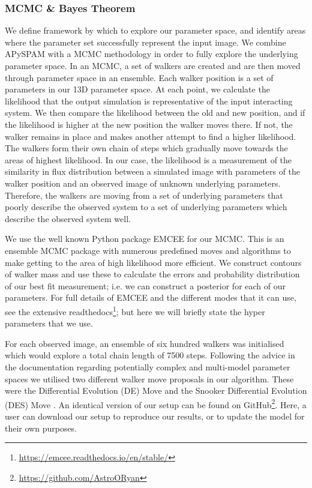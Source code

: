 \subsubsection{MCMC \& Bayes Theorem}
We define framework by which to explore our parameter space, and identify areas where the parameter set successfully represent the input image. We combine APySPAM with a MCMC methodology in order to fully explore the underlying parameter space. In an MCMC, a set of walkers are created and are then moved through parameter space in an ensemble. Each walker position is a set of parameters in our 13D parameter space. At each point, we calculate the likelihood that the output simulation is representative of the input interacting system. We then compare the likelihood between the old and new position, and if the likelihood is higher at the new position the walker moves there. If not, the walker remains in place and makes another attempt to find a higher likelihood. The walkers form their own chain of steps which gradually move towards the areas of highest likelihood. In our case, the likelihood is a measurement of the similarity in flux distribution between a simulated image with parameters of the walker position and an observed image of unknown underlying parameters. Therefore, the walkers are moving from a set of underlying parameters that poorly describe the observed system to a set of underlying parameters which describe the observed system well. 

We use the well known Python package EMCEE \citep{Foreman-Mackey_13} for our MCMC. This is an ensemble MCMC package with numerous predefined moves and algorithms to make getting to the area of high likelihood more efficient. We construct contours of walker mass and use these to calculate the errors and probability distribution of our best fit measurement; i.e. we can construct a posterior for each of our parameters. For full details of EMCEE and the different modes that it can use, see the extensive readthedocs\footnote{\url{https://emcee.readthedocs.io/en/stable/}}; but here we will briefly state the hyper parameters that we use. 

For each observed image, an ensemble of six hundred walkers was initialised which would explore a total chain length of 7500 steps. Following the advice in the documentation regarding potentially complex and multi-model parameter spaces we utilised two different walker move proposals in our algorithm. These were the Differential Evolution (DE) Move \citep{Nelson_14} and the Snooker Differential Evolution (DES) Move \citep{ter_Braak_08}. An identical version of our setup can be found on GitHub\footnote{\url{https://github.com/AstroORyan}}. Here, a user can download our setup to reproduce our results, or to update the model for their own purposes.

